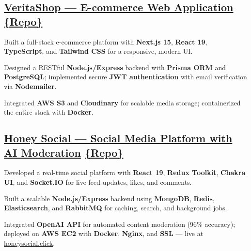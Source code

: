 \subsection{\href{https://github.com/hjsad1994/VeritaShop-Ecommerce-WebApp}{VeritaShop --- E-commerce Web Application} \href{https://github.com/hjsad1994/VeritaShop-Ecommerce-WebApp}{\{Repo\}}}
\begin{zitemize}
\item Built a full-stack e-commerce platform with \textbf{Next.js 15}, \textbf{React 19}, \textbf{TypeScript}, and \textbf{Tailwind CSS} for a responsive, modern UI.
\item Designed a RESTful \textbf{Node.js/Express} backend with \textbf{Prisma ORM} and \textbf{PostgreSQL}; implemented secure \textbf{JWT authentication} with email verification via \textbf{Nodemailer}.
\item Integrated \textbf{AWS S3} and \textbf{Cloudinary} for scalable media storage; containerized the entire stack with \textbf{Docker}.
\end{zitemize}

\subsection{\href{https://honeysocial.click}{Honey Social --- Social Media Platform with AI Moderation} \href{https://github.com/hjsad1994/honey-social}{\{Repo\}}}
\begin{zitemize}
\item Developed a real-time social platform with \textbf{React 19}, \textbf{Redux Toolkit}, \textbf{Chakra UI}, and \textbf{Socket.IO} for live feed updates, likes, and comments.
\item Built a scalable \textbf{Node.js/Express} backend using \textbf{MongoDB}, \textbf{Redis}, \textbf{Elasticsearch}, and \textbf{RabbitMQ} for caching, search, and background jobs.
\item Integrated \textbf{OpenAI API} for automated content moderation (96\% accuracy); deployed on \textbf{AWS EC2} with \textbf{Docker}, \textbf{Nginx}, and \textbf{SSL} --- live at \href{https://honeysocial.click}{honeysocial.click}.
\end{zitemize}

